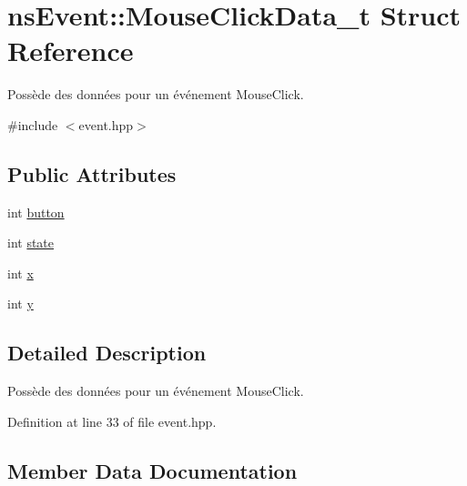 \hypertarget{structns_event_1_1_mouse_click_data__t}{}\section{ns\+Event\+:\+:Mouse\+Click\+Data\+\_\+t Struct Reference}
\label{structns_event_1_1_mouse_click_data__t}


Possède des données pour un événement Mouse\+Click.  




{\ttfamily \#include $<$event.\+hpp$>$}

\subsection*{Public Attributes}
\begin{DoxyCompactItemize}
\item 
int \hyperlink{structns_event_1_1_mouse_click_data__t_a8c4c8e7b68c38ee4819957050bfd2926}{button}
\item 
int \hyperlink{structns_event_1_1_mouse_click_data__t_a81252b916361dc4deab0f42510fdc928}{state}
\item 
int \hyperlink{structns_event_1_1_mouse_click_data__t_a57f8fe6b3c3fb74e0d657158fb24010e}{x}
\item 
int \hyperlink{structns_event_1_1_mouse_click_data__t_a0a2e34034a5b6c8c44087966243fc261}{y}
\end{DoxyCompactItemize}


\subsection{Detailed Description}
Possède des données pour un événement Mouse\+Click. 

Definition at line 33 of file event.\+hpp.



\subsection{Member Data Documentation}
\mbox{\label{structns_event_1_1_mouse_click_data__t_a8c4c8e7b68c38ee4819957050bfd2926}} 
